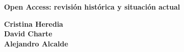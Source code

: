 \documentclass[a0,portrait]{a0poster}
\begin{document}


\begin{minipage}[b]{1\linewidth}
  \VeryHuge \color{NavyBlue} \textbf{Open Access: revisión histórica y situación actual} \color{Black}\\ %

  \vspace{1cm} %

  \huge \textbf{Cristina Heredia}\\[0.6cm] %
  \huge \textbf{David Charte}\\[0.5cm] %
  \huge \textbf{Alejandro Alcalde} \\[0.5cm] %
\end{minipage}
%
\begin{minipage}[b]{0.25\linewidth}
\end{minipage}

\vspace{1cm} %

\end{document}
